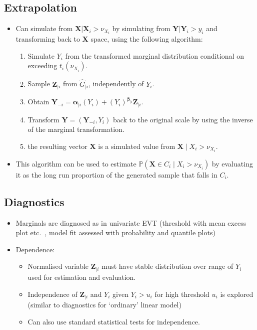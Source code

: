 \documentclass{article}
\begin{document}

\subsection{Extrapolation}

\begin{itemize}
  \item Can simulate from $\bm{X}|\bm{X}_i > \nu_{X_i}$ by simulating from $\bm{Y}|\bm{Y}_i > y_i$ and transforming back to $\bm{X}$ space, using the following algorithm:
    \begin{enumerate}
      \item Simulate $Y_i$ from the transformed marginal distribution conditional on exceeding $t_i(\nu_{X_i})$.
      \item Sample $\bm{Z}_{\mid i}$ from $\hat{G}_{\mid i}$, independently of $Y_i$. 
      \item Obtain $\bm{Y}_{-i} = \bm{\alpha}_{\mid i}(Y_i) + (Y_i)^{\bm{\beta}_{\mid i}}\bm{Z}_{\mid i}$.
      \item Transform $\bm{Y} = (\bm{Y}_{-i}, Y_i)$ back to the original scale by using the inverse of the marginal transformation. 
      \item the resulting vector $\bm{X}$ is a simulated value from $\bm{X} \mid X_i > \nu_{X_i}$.
    \end{enumerate}
  \item This algorithm can be used to estimate $\mathbb{P}(\bm{X} \in C_i \mid X_i > \nu_{X_i})$ by evaluating it as the long run proportion of the generated sample that falls in $C_i$. 
\end{itemize}

\subsection{Diagnostics}

\begin{itemize}
  \item Marginals are diagnosed as in univariate EVT (threshold with mean excess plot etc.\ , model fit assessed with probability and quantile plots)
  \item Dependence:
    \begin{itemize}
      \item Normalised variable $\bm{Z}_{\mid i}$ must have stable distribution over range of $Y_i$ used for estimation and evaluation. 
      \item Independence of $\bm{Z}_{\mid i}$ and $Y_i$ given $Y_i > u_i$ for high threshold $u_i$ is explored (similar to diagnostics for `ordinary' linear model)
      \item Can also use standard statistical tests for independence. 
    \end{itemize}
\end{itemize}
\end{document}
